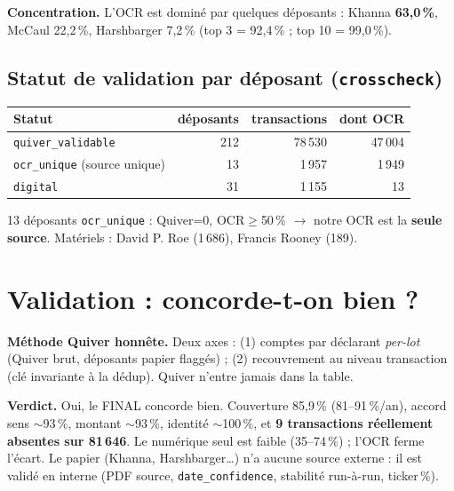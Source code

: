 \documentclass[11pt,a4paper]{article}
\begin{document}
\textbf{Concentration.} L'OCR est dominé par quelques déposants : Khanna \textbf{63,0\,\%},
McCaul 22,2\,\%, Harshbarger 7,2\,\% (top 3 = 92,4\,\% ; top 10 = 99,0\,\%).

\subsection{Statut de validation par déposant (\texttt{crosscheck})}
\begin{center}\small
\begin{tabular}{@{}lrrr@{}}
\toprule
\textbf{Statut} & \textbf{déposants} & \textbf{transactions} & \textbf{dont OCR} \\
\midrule
\texttt{quiver\_validable} & 212 & 78\,530 & 47\,004 \\
\texttt{ocr\_unique} (source unique) & 13 & 1\,957 & 1\,949 \\
\texttt{digital} & 31 & 1\,155 & 13 \\
\bottomrule
\end{tabular}
\end{center}
13 déposants \texttt{ocr\_unique} : Quiver=0, OCR$\geq$50\,\% $\rightarrow$ notre OCR est la
\textbf{seule source}. Matériels : David P. Roe (1\,686), Francis Rooney (189).

\section{Validation : concorde-t-on bien ?}
\textbf{Méthode Quiver honnête.} Deux axes : (1) comptes par déclarant \emph{per-lot} (Quiver brut,
déposants papier flaggés) ; (2) recouvrement au niveau transaction (clé invariante à la dédup). Quiver
n'entre jamais dans la table.

\textbf{Verdict.} Oui, le FINAL concorde bien. Couverture 85,9\,\% (81--91\,\%/an), accord sens
$\sim$93\,\%, montant $\sim$93\,\%, identité $\sim$100\,\%, et \textbf{9 transactions réellement
absentes sur 81\,646}. Le numérique seul est faible (35--74\,\%) ; l'OCR ferme l'écart. Le papier
(Khanna, Harshbarger\dots) n'a aucune source externe : il est validé en interne (PDF source,
\texttt{date\_confidence}, stabilité run-à-run, ticker\,\%).

\end{document}
